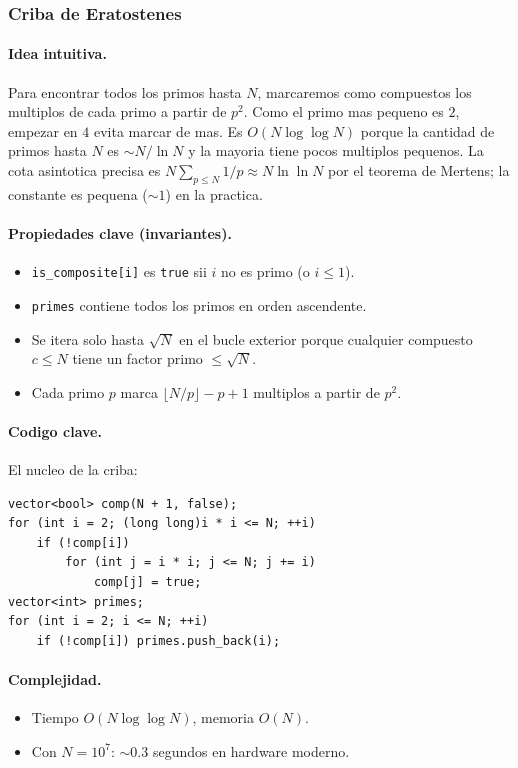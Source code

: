 ﻿\subsubsection{Criba de Eratostenes}

\paragraph{Idea intuitiva.}
Para encontrar todos los primos hasta $N$, marcaremos como compuestos los multiplos de cada primo a partir de $p^2$. Como el primo mas pequeno es $2$, empezar en $4$ evita marcar de mas. Es $O(N \log \log N)$ porque la cantidad de primos hasta $N$ es $\sim N / \ln N$ y la mayoria tiene pocos multiplos pequenos. La cota asintotica precisa es $N \sum_{p \le N} 1/p \approx N \ln \ln N$ por el teorema de Mertens; la constante es pequena ($\sim 1$) en la practica.

\paragraph{Propiedades clave (invariantes).}
\begin{itemize}\setlength\itemsep{0pt}
	\item \texttt{is\_composite[i]} es \texttt{true} sii $i$ no es primo (o $i \le 1$).
	\item \texttt{primes} contiene todos los primos en orden ascendente.
	\item Se itera solo hasta $\sqrt{N}$ en el bucle exterior porque cualquier compuesto $c \le N$ tiene un factor primo $\le \sqrt{N}$.
	\item Cada primo $p$ marca $\lfloor N/p \rfloor - p + 1$ multiplos a partir de $p^2$.
\end{itemize}

\paragraph{Codigo clave.}
El nucleo de la criba:
\begin{verbatim}
vector<bool> comp(N + 1, false);
for (int i = 2; (long long)i * i <= N; ++i)
    if (!comp[i])
        for (int j = i * i; j <= N; j += i)
            comp[j] = true;
vector<int> primes;
for (int i = 2; i <= N; ++i)
    if (!comp[i]) primes.push_back(i);
\end{verbatim}

\paragraph{Complejidad.}
\begin{itemize}\setlength\itemsep{0pt}
	\item Tiempo $O(N \log \log N)$, memoria $O(N)$.
	\item Con $N = 10^7$: $\sim$0.3 segundos en hardware moderno.
\end{itemize}

